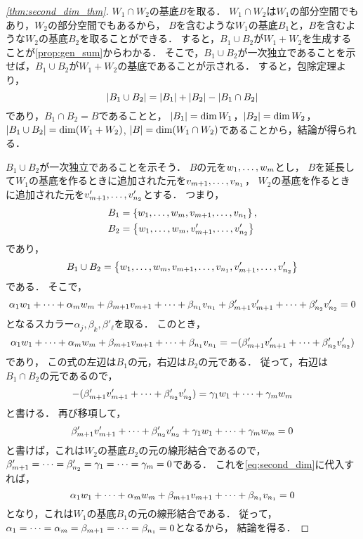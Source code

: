 \begin{proof}[\cref{thm:second_dim_thm}]
  $W_1 \cap W_2$の基底$B$を取る．
  $W_1 \cap W_2$は$W_1$の部分空間でもあり，$W_2$の部分空間でもあるから，
  $B$を含むような$W_1$の基底$B_1$と，$B$を含むような$W_2$の基底$B_2$を取ることができる．
  すると，$B_1 \cup B_2$が$W_1 + W_2$を生成することが\cref{prop:gen_sum}からわかる．
  そこで，$B_1 \cup B_2$が一次独立であることを示せば，$B_1 \cup B_2$が$W_1 + W_2$の基底であることが示される．
  すると，包除定理より，
  \[
    \abs{B_1 \cup B_2} = \abs{B_1} + \abs{B_2} - \abs{B_1 \cap B_2}
  \]
  であり，$B_1 \cap B_2 = B$であることと，
  $\abs{B_1} = \dim W_1$，$\abs{B_2} = \dim W_2$，$\abs{B_1 \cup B_2} = \dim (W_1 + W_2)$, $\abs{B} = \dim (W_1 \cap W_2)$であることから，結論が得られる．

  $B_1 \cup B_2$が一次独立であることを示そう．
  $B$の元を$\idxdot{w}{1}{m}$とし，
  $B$を延長して$W_1$の基底を作るときに追加された元を$\idxdot{v}{m+1}{n_1}$，
  $W_2$の基底を作るときに追加された元を$\idxdot{v'}{m+1}{n_2}$とする．
  つまり，
  \[
    \begin{aligned}
      B_1 &= \left\{ \idxdot{w}{1}{m}, \idxdot{v}{m+1}{n_1} \right\}, \\
      B_2 &= \left\{ \idxdot{w}{1}{m}, \idxdot{v'}{m+1}{n_2} \right\}
    \end{aligned}
  \]
  であり，
  \[
    B_1 \cup B_2 = \left\{ \idxdot{w}{1}{m}, \idxdot{v}{m+1}{n_1}, \idxdot{v'}{m+1}{n_2} \right\}
  \]
  である．
  そこで，
  \begin{equation}\label{eq:second_dim}
    \lncmb{\alpha}{w}{1}{m}{+} + \lncmb{\beta}{v}{m+1}{n_1}{+} + \lncmb{\beta'}{v'}{m+1}{n_2}{+} = 0
  \end{equation}
  となるスカラー$\alpha_j,\beta_k,\beta'_\ell$を取る．
  このとき，
  \[
    \lncmb{\alpha}{w}{1}{m}{+} + \lncmb{\beta}{v}{m+1}{n_1}{+} =  - (\lncmb{\beta'}{v'}{m+1}{n_2}{+})
  \]
  であり，
  この式の左辺は$B_1$の元，右辺は$B_2$の元である．
  従って，右辺は$B_1 \cap B_2$の元であるので，
  \[
    -(\lncmb{\beta'}{v'}{m+1}{n_2}{+}) = \lncmb{\gamma}{w}{1}{m}{+}
  \]
  と書ける．
  再び移項して，
  \[
    \lncmb{\beta'}{v'}{m+1}{n_2}{+} + \lncmb{\gamma}{w}{1}{m}{+} = 0
  \]
  と書けば，これは$W_2$の基底$B_2$の元の線形結合であるので，
  $\idxsum{\beta'}{m+1}{n_2}{=} = \idxsum{\gamma}{1}{m}{=} = 0$である．
  これを\eqref{eq:second_dim}に代入すれば，
  \[
    \lncmb{\alpha}{w}{1}{m}{+} + \lncmb{\beta}{v}{m+1}{n_1}{+} = 0
  \]
  となり，これは$W_1$の基底$B_1$の元の線形結合である．
  従って，$\idxsum{\alpha}{1}{m}{=} = \idxsum{\beta}{m+1}{n_1}{=} = 0$となるから，
  結論を得る．
\end{proof}
